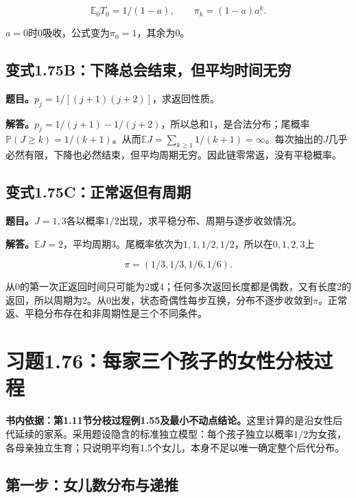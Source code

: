 \documentclass[
  11pt,a4paper,UTF8,fontset=fandol]{ctexart}
\begin{document}
\[\boxed{\mathbb E_0T_0=1/(1-a),\qquad\pi_k=(1-a)a^k.}\]

\(a=0\)时0吸收，公式变为\(\pi_0=1\)，其余为0。

\subsection{变式1.75B：下降总会结束，但平均时间无穷}\label{ux53d8ux5f0f1.75bux4e0bux964dux603bux4f1aux7ed3ux675fux4f46ux5e73ux5747ux65f6ux95f4ux65e0ux7a77}

\textbf{题目。}\(p_j=1/[(j+1)(j+2)]\)，求返回性质。

\textbf{解答。}\(p_j=1/(j+1)-1/(j+2)\)，所以总和1，是合法分布；尾概率\(\mathbb P(J\ge k)=1/(k+1)\)。从而\(\mathbb EJ=\sum_{k\ge1}1/(k+1)=\infty\)。每次抽出的\(J\)几乎必然有限，下降也必然结束，但平均周期无穷。因此链零常返，没有平稳概率。

\subsection{变式1.75C：正常返但有周期}\label{ux53d8ux5f0f1.75cux6b63ux5e38ux8fd4ux4f46ux6709ux5468ux671f}

\textbf{题目。}\(J=1,3\)各以概率\(1/2\)出现，求平稳分布、周期与逐步收敛情况。

\textbf{解答。}\(\mathbb EJ=2\)，平均周期3。尾概率依次为\(1,1,1/2,1/2\)，所以在\(0,1,2,3\)上

\[\boxed{\pi=(1/3,1/3,1/6,1/6).}\]

从0的第一次正返回时间只可能为2或4；任何多次返回长度都是偶数，又有长度2的返回，所以周期为2。从0出发，状态奇偶性每步互换，分布不逐步收敛到\(\pi\)。正常返、平稳分布存在和非周期性是三个不同条件。

\section{习题1.76：每家三个孩子的女性分枝过程}\label{ux4e60ux98981.76ux6bcfux5bb6ux4e09ux4e2aux5b69ux5b50ux7684ux5973ux6027ux5206ux679dux8fc7ux7a0b}

\textbf{书内依据：第1.11节分枝过程例1.55及最小不动点结论。}这里计算的是沿女性后代延续的家系。采用题设隐含的标准独立模型：每个孩子独立以概率\(1/2\)为女孩，各母亲独立生育；只说明平均有1.5个女儿，本身不足以唯一确定整个后代分布。

\subsection{第一步：女儿数分布与递推}\label{ux7b2cux4e00ux6b65ux5973ux513fux6570ux5206ux5e03ux4e0eux9012ux63a8}
\end{document}
